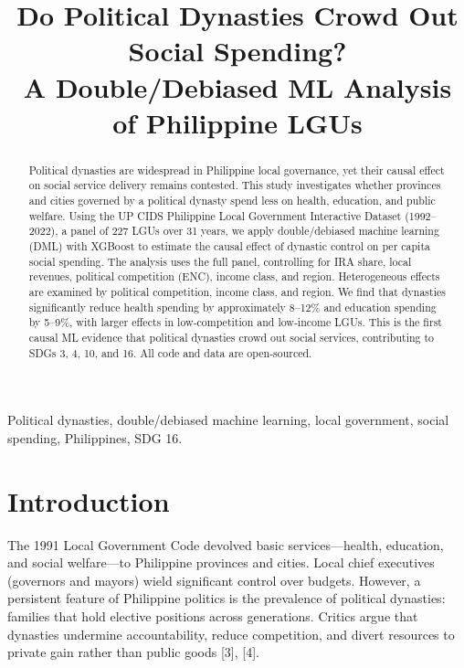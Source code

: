 \documentclass[conference]{IEEEtran}
\begin{document}
\title{Do Political Dynasties Crowd Out Social Spending?\\ 
\Large A Double/Debiased ML Analysis of Philippine LGUs}

\author{
}

\maketitle

\begin{abstract}
Political dynasties are widespread in Philippine local governance, yet their causal effect on social service delivery remains contested. This study investigates whether provinces and cities governed by a political dynasty spend less on health, education, and public welfare. Using the UP CIDS Philippine Local Government Interactive Dataset (1992--2022), a panel of 227 LGUs over 31 years, we apply double/debiased machine learning (DML) with XGBoost to estimate the causal effect of dynastic control on per capita social spending. The analysis uses the full panel, controlling for IRA share, local revenues, political competition (ENC), income class, and region. Heterogeneous effects are examined by political competition, income class, and region. We find that dynasties significantly reduce health spending by approximately 8--12\% and education spending by 5--9\%, with larger effects in low‑competition and low‑income LGUs. This is the first causal ML evidence that political dynasties crowd out social services, contributing to SDGs 3, 4, 10, and 16. All code and data are open‑sourced.
\end{abstract}

\begin{IEEEkeywords}
Political dynasties, double/debiased machine learning, local government, social spending, Philippines, SDG 16.
\end{IEEEkeywords}

\section{Introduction}

The 1991 Local Government Code devolved basic services---health, education, and social welfare---to Philippine provinces and cities. Local chief executives (governors and mayors) wield significant control over budgets. However, a persistent feature of Philippine politics is the prevalence of political dynasties: families that hold elective positions across generations. Critics argue that dynasties undermine accountability, reduce competition, and divert resources to private gain rather than public goods [3], [4].
\end{document}

